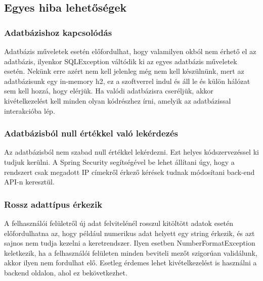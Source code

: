 \subsection{Egyes hiba lehetőségek}

\subsubsection{Adatbázishoz kapcsolódás}
Adatbázis műveletek esetén előfordulhat, hogy valamilyen okból nem érhető el az adatbázis, ilyenkor SQLException váltódik ki az egyes adatbázis műveletek esetén. Nekünk erre azért nem kell jelenleg még nem kell készülnünk, mert az adatbázisunk egy in-memory h2, ez a szoftverrel indul és áll le és külön hálózat sem kell hozzá, hogy elérjük. Ha valódi adatbázisra cseréljük, akkor kivételkezelést kell minden olyan kódrészhez írni, amelyik az adatbázissal interakcióba lép.

\subsubsection{Adatbázisból null értékkel való lekérdezés}
Az adatbázisból nem szabad null értékkel lekérdezni. Ezt helyes kódszervezéssel ki tudjuk kerülni. A Spring Security segítségével be lehet állítani úgy, hogy a rendszert csak megadott IP címekről érkező kérések tudnak módosítani back-end API-n keresztül.

\subsubsection{Rossz adattípus érkezik}
A felhasználói felületről új adat felvitelénél rosszul kitöltött adatok esetén előfordulhatna az, hogy például numerikus adat helyett egy string érkezik, és azt sajnos nem tudja kezelni a keretrendszer. Ilyen esetben NumberFormatException keletkezik, ha a felhasználói felületen minden beviteli mezőt szigorúan validálunk, akkor ilyen nem fordulhat elő. Esetleg érdemes lehet kivételkezelést is használni a backend oldalon, ahol ez bekövetkezhet. 